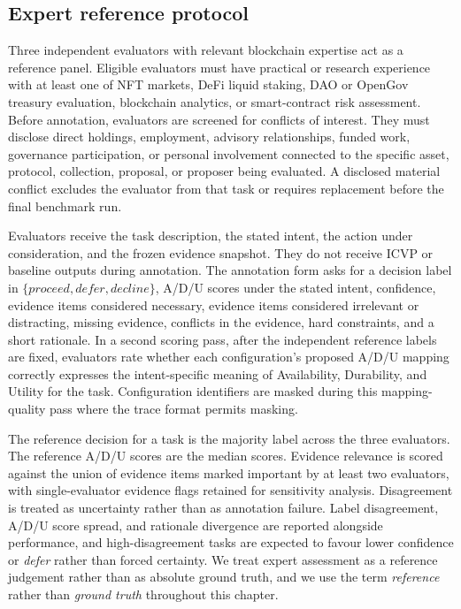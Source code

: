 \subsection{Expert reference protocol}

Three independent evaluators with relevant blockchain expertise act as a reference panel. Eligible evaluators must have practical or research experience with at least one of NFT markets, DeFi liquid staking, DAO or OpenGov treasury evaluation, blockchain analytics, or smart-contract risk assessment. Before annotation, evaluators are screened for conflicts of interest. They must disclose direct holdings, employment, advisory relationships, funded work, governance participation, or personal involvement connected to the specific asset, protocol, collection, proposal, or proposer being evaluated. A disclosed material conflict excludes the evaluator from that task or requires replacement before the final benchmark run.

Evaluators receive the task description, the stated intent, the action under consideration, and the frozen evidence snapshot. They do not receive ICVP or baseline outputs during annotation. The annotation form asks for a decision label in $\{\textit{proceed}, \textit{defer}, \textit{decline}\}$, A/D/U scores under the stated intent, confidence, evidence items considered necessary, evidence items considered irrelevant or distracting, missing evidence, conflicts in the evidence, hard constraints, and a short rationale. In a second scoring pass, after the independent reference labels are fixed, evaluators rate whether each configuration's proposed A/D/U mapping correctly expresses the intent-specific meaning of Availability, Durability, and Utility for the task. Configuration identifiers are masked during this mapping-quality pass where the trace format permits masking.

The reference decision for a task is the majority label across the three evaluators. The reference A/D/U scores are the median scores. Evidence relevance is scored against the union of evidence items marked important by at least two evaluators, with single-evaluator evidence flags retained for sensitivity analysis. Disagreement is treated as uncertainty rather than as annotation failure. Label disagreement, A/D/U score spread, and rationale divergence are reported alongside performance, and high-disagreement tasks are expected to favour lower confidence or \textit{defer} rather than forced certainty. We treat expert assessment as a reference judgement rather than as absolute ground truth, and we use the term \emph{reference} rather than \emph{ground truth} throughout this chapter.

